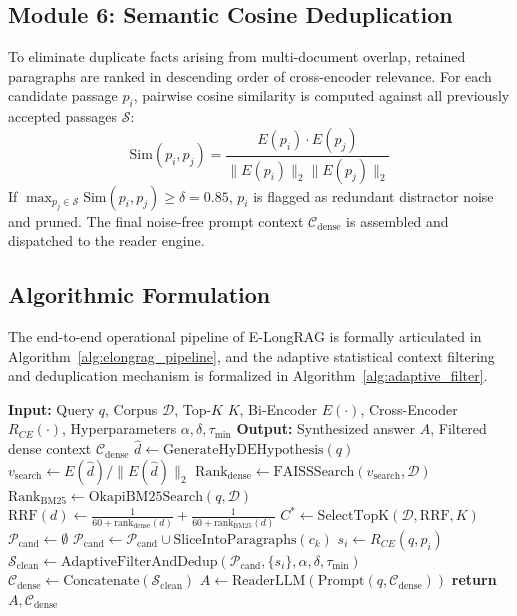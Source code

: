\documentclass[lettersize,journal]{IEEEtran}
\begin{document}
\subsection{Module 6: Semantic Cosine Deduplication}
To eliminate duplicate facts arising from multi-document overlap, retained paragraphs are ranked in descending order of cross-encoder relevance. For each candidate passage $p_i$, pairwise cosine similarity is computed against all previously accepted passages $\mathcal{S}$:
\begin{equation}
\label{eq:cosine_sim}
\text{Sim}(p_i, p_j) = \frac{E(p_i) \cdot E(p_j)}{\|E(p_i)\|_2 \|E(p_j)\|_2}
\end{equation}
If $\max_{p_j \in \mathcal{S}} \text{Sim}(p_i, p_j) \ge \delta = 0.85$, $p_i$ is flagged as redundant distractor noise and pruned. The final noise-free prompt context $\mathcal{C}_{\text{dense}}$ is assembled and dispatched to the reader engine.

\subsection{Algorithmic Formulation}
The end-to-end operational pipeline of E-LongRAG is formally articulated in Algorithm~\ref{alg:elongrag_pipeline}, and the adaptive statistical context filtering and deduplication mechanism is formalized in Algorithm~\ref{alg:adaptive_filter}.

\begin{algorithm}[H]
\caption{End-to-End E-LongRAG Hybrid Retrieval and Filtering Pipeline}\label{alg:elongrag_pipeline}
\begin{algorithmic}[1]
\STATE \textbf{Input:} Query $q$, Corpus $\mathcal{D}$, Top-$K$ $K$, Bi-Encoder $E(\cdot)$, Cross-Encoder $R_{CE}(\cdot)$, Hyperparameters $\alpha, \delta, \tau_{\min}$
\STATE \textbf{Output:} Synthesized answer $A$, Filtered dense context $\mathcal{C}_{\text{dense}}$
\STATE $\hat{d} \gets \text{GenerateHyDEHypothesis}(q)$
\STATE $v_{\text{search}} \gets E(\hat{d}) / \|E(\hat{d})\|_2$
\STATE $\text{Rank}_{\text{dense}} \gets \text{FAISSSearch}(v_{\text{search}}, \mathcal{D})$
\STATE $\text{Rank}_{\text{BM25}} \gets \text{OkapiBM25Search}(q, \mathcal{D})$
    \STATE $\text{RRF}(d) \gets \frac{1}{60 + \text{rank}_{\text{dense}}(d)} + \frac{1}{60 + \text{rank}_{\text{BM25}}(d)}$
\ENDFOR
\STATE $C^* \gets \text{SelectTopK}(\mathcal{D}, \text{RRF}, K)$
\STATE $\mathcal{P}_{\text{cand}} \gets \emptyset$
    \STATE $\mathcal{P}_{\text{cand}} \gets \mathcal{P}_{\text{cand}} \cup \text{SliceIntoParagraphs}(c_k)$
\ENDFOR
{}
    \STATE $s_i \gets R_{CE}(q, p_i)$
\ENDFOR
\STATE $\mathcal{S}_{\text{clean}} \gets \text{AdaptiveFilterAndDedup}(\mathcal{P}_{\text{cand}}, \{s_i\}, \alpha, \delta, \tau_{\min})$
\STATE $\mathcal{C}_{\text{dense}} \gets \text{Concatenate}(\mathcal{S}_{\text{clean}})$
\STATE $A \gets \text{ReaderLLM}(\text{Prompt}(q, \mathcal{C}_{\text{dense}}))$
\STATE \textbf{return} $A, \mathcal{C}_{\text{dense}}$
\end{algorithmic}
\end{algorithm}
\end{document}
